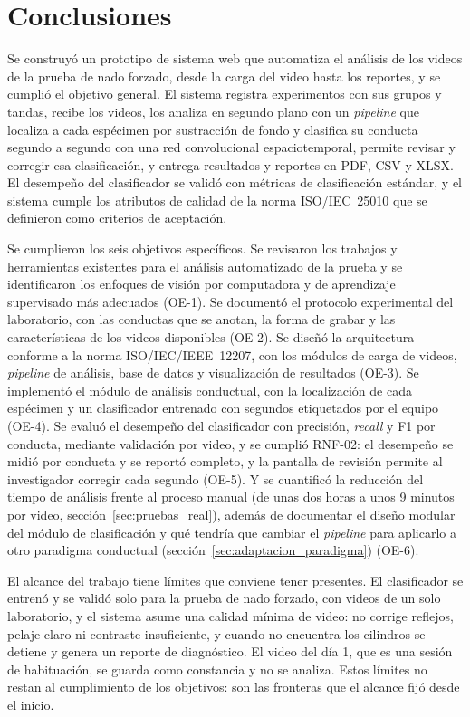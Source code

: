\chapter*{Conclusiones}
\label{cap:conclusiones}

Se construyó un prototipo de sistema web que automatiza el análisis de los videos de la
prueba de nado forzado, desde la carga del video hasta los reportes, y se cumplió el
objetivo general. El sistema registra experimentos con sus grupos y tandas, recibe los
videos, los analiza en segundo plano con un \textit{pipeline} que localiza a cada espécimen
por sustracción de fondo y clasifica su conducta segundo a segundo con una red
convolucional espaciotemporal, permite revisar y corregir esa clasificación, y entrega
resultados y reportes en PDF, CSV y XLSX. El desempeño del clasificador se validó con
métricas de clasificación estándar, y el sistema cumple los atributos de calidad de la
norma ISO/IEC~25010 que se definieron como criterios de aceptación.

Se cumplieron los seis objetivos específicos. Se revisaron los trabajos y herramientas
existentes para el análisis automatizado de la prueba y se identificaron los enfoques de
visión por computadora y de aprendizaje supervisado más adecuados (OE-1). Se documentó el
protocolo experimental del laboratorio, con las conductas que se anotan, la forma de
grabar y las características de los videos disponibles (OE-2). Se diseñó la arquitectura
conforme a la norma ISO/IEC/IEEE~12207, con los módulos de carga de videos,
\textit{pipeline} de análisis, base de datos y visualización de resultados (OE-3). Se
implementó el módulo de análisis conductual, con la localización de cada espécimen y un
clasificador entrenado con segundos etiquetados por el equipo (OE-4). Se evaluó el
desempeño del clasificador con precisión, \textit{recall} y F1 por conducta, mediante
validación por video, y se cumplió RNF-02: el desempeño se midió por conducta y se
reportó completo, y la pantalla de revisión permite al investigador corregir cada
segundo (OE-5). Y se cuantificó la reducción del tiempo de análisis frente al proceso manual (de unas dos horas a unos 9 minutos por video,
sección~\ref{sec:pruebas_real}), además de documentar el diseño modular del módulo de clasificación y qué tendría
que cambiar el \textit{pipeline} para aplicarlo a otro paradigma conductual (sección~\ref{sec:adaptacion_paradigma}) (OE-6).

El alcance del trabajo tiene límites que conviene tener presentes. El clasificador se
entrenó y se validó solo para la prueba de nado forzado, con videos de un solo
laboratorio, y el sistema asume una calidad mínima de video: no corrige reflejos, pelaje
claro ni contraste insuficiente, y cuando no encuentra los cilindros se detiene y genera
un reporte de diagnóstico. El video del día 1, que es una sesión de habituación, se
guarda como constancia y no se analiza. Estos límites no restan al cumplimiento de los
objetivos: son las fronteras que el alcance fijó desde el inicio.

